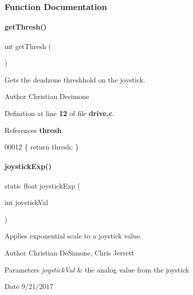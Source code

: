 \subsubsection{Function Documentation}
\mbox{\label{drive_8c_a9caa5e772598f9182c9ec84cf8c351ee}} 
\paragraph{get\+Thresh()}
{\footnotesize\ttfamily int get\+Thresh (\begin{DoxyParamCaption}{ }\end{DoxyParamCaption})}



Gets the deadzone threshhold on the joystick. 

\begin{DoxyAuthor}{Author}
Christian Desimone 
\end{DoxyAuthor}


Definition at line \textbf{ 12} of file \textbf{ drive.\+c}.



References \textbf{ thresh}.


\begin{DoxyCode}
00012 \{ \textcolor{keywordflow}{return} thresh; \}
\end{DoxyCode}
\mbox{\label{drive_8c_a6de4fbb9197f2f350c53a9f8bf23a8f1}} 
\paragraph{joystick\+Exp()}
{\footnotesize\ttfamily static float joystick\+Exp (\begin{DoxyParamCaption}\item[{int}]{joystick\+Val }\end{DoxyParamCaption})\hspace{0.3cm}{\ttfamily [static]}}



Applies exponential scale to a joystick value. 

\begin{DoxyAuthor}{Author}
Christian De\+Simone, Chris Jerrett 
\end{DoxyAuthor}

\begin{DoxyParams}{Parameters}
{\em joystick\+Val} & the analog value from the joystick \\
\hline
\end{DoxyParams}
\begin{DoxyDate}{Date}
9/21/2017 
\end{DoxyDate}


